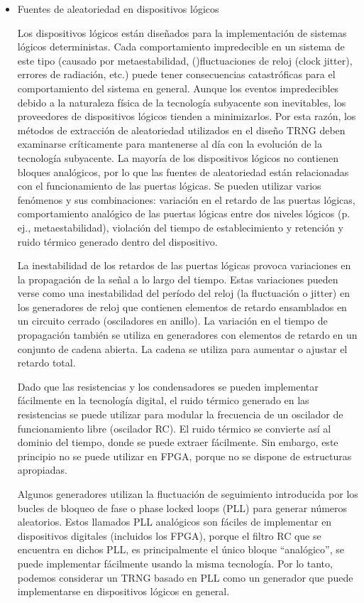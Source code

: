 			
			\begin{itemize}
				\item Fuentes de aleatoriedad en dispositivos lógicos 
				
					Los dispositivos lógicos están diseñados para la implementación de sistemas lógicos deterministas. Cada comportamiento impredecible en un sistema de este tipo (causado por metaestabilidad, ()fluctuaciones de reloj (clock jitter), errores de radiación, etc.) puede tener consecuencias catastróficas para el comportamiento del sistema en general. Aunque los eventos impredecibles debido a la naturaleza física de la tecnología subyacente son inevitables, los proveedores de dispositivos lógicos tienden a minimizarlos. Por esta razón, los métodos de extracción de aleatoriedad utilizados en el diseño TRNG deben examinarse críticamente para mantenerse al día con la evolución de la tecnología subyacente. La mayoría de los dispositivos lógicos no contienen bloques analógicos, por lo que las fuentes de aleatoriedad están relacionadas con el funcionamiento de las puertas lógicas. Se pueden utilizar varios fenómenos y sus combinaciones: variación en el retardo de las puertas lógicas, comportamiento analógico de las puertas lógicas entre dos niveles lógicos (p. ej., metaestabilidad), violación del tiempo de establecimiento y retención y ruido térmico generado dentro del dispositivo.	
					
					La inestabilidad de los retardos de las puertas lógicas provoca variaciones en la propagación de la señal a lo largo del tiempo. Estas variaciones pueden verse como una inestabilidad del período del reloj (la fluctuación o jitter) en los generadores de reloj que contienen elementos de retardo ensamblados en un circuito cerrado (osciladores en anillo). La variación en el tiempo de propagación también se utiliza en generadores con elementos de retardo en un conjunto de cadena abierta. La cadena se utiliza para aumentar o ajustar el retardo total.
					
					Dado que las resistencias y los condensadores se pueden implementar fácilmente en la tecnología digital, el ruido térmico generado en las resistencias se puede utilizar para modular la frecuencia de un oscilador de funcionamiento libre (oscilador RC). El ruido térmico se convierte así al dominio del tiempo, donde se puede extraer fácilmente. Sin embargo, este principio no se puede utilizar en FPGA, porque no se dispone de estructuras apropiadas.
					
					Algunos generadores utilizan la fluctuación de seguimiento introducida por los bucles de bloqueo de fase o phase locked loops (PLL) para generar números aleatorios. Estos llamados PLL analógicos son fáciles de implementar en dispositivos digitales (incluidos los FPGA), porque el filtro RC que se encuentra en dichos PLL, es principalmente el único bloque ``analógico'', se puede implementar fácilmente usando la misma tecnología. Por lo tanto, podemos considerar un TRNG basado en PLL como un generador que puede implementarse en dispositivos lógicos en general.
				

\end{itemize}
